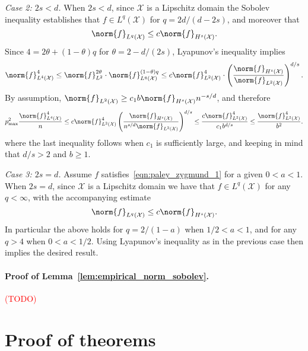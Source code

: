 \documentclass{article}
\newcommand{\1}{\mathbf{1}}
\newcommand{\Xset}{\mathcal{X}}
\newcommand{\Leb}{L}
\theoremstyle{alden}
\theoremstyle{aldenthm}
\theoremstyle{definition}
\theoremstyle{remark}
\begin{document}
\textit{Case 2: $2s < d$.}
When $2s < d$, since $\Xset$ is a Lipschitz domain the Sobolev inequality establishes that $f \in \Leb^q(\Xset)$ for $q = 2d/(d - 2s)$, and moreover that
\begin{equation*}
\norm{f}_{\Leb^q(\Xset)} \leq c \norm{f}_{H^s(\Xset)}.
\end{equation*}
Since $4 = 2\theta + (1 - \theta)q$ for $\theta = 2 - d/(2s)$, Lyapunov's inequality implies
\begin{equation*}
\norm{f}_{\Leb^4(\Xset)}^4 \leq \norm{f}_{\Leb^2}^{2\theta} \cdot \norm{f}_{\Leb^q(\Xset)}^{(1 - \theta)q} \leq c \norm{f}_{\Leb^2(\Xset)}^{4} \cdot \left(\frac{\norm{f}_{H^s(\Xset)}}{\norm{f}_{\Leb^2(\Xset)}}\right)^{d/s}.
\end{equation*}
By assumption, $\norm{f}_{\Leb^2(\Xset)} \geq c_1 b \norm{f}_{H^s(\Xset)} n^{-s/d}$, and therefore
\begin{equation*}
p_{\max}^2 \frac{\norm{f}_{\Leb^4(\Xset)}^4}{n} \leq c\norm{f}_{\Leb^2(\Xset)}^4 \left(\frac{\norm{f}_{H^s(\Xset)}}{n^{s/d}\norm{f}_{\Leb^2(\Xset)}}\right)^{d/s} \leq \frac{c\norm{f}_{\Leb^2(\Xset)}^4}{c_1b^{d/s}} \leq \frac{\norm{f}_{\Leb^2(\Xset)}^4}{b^2}.
\end{equation*}
where the last inequality follows when $c_1$ is sufficiently large, and keeping in mind that $d/s > 2$ and $b \geq 1$. 

\textit{Case 3: $2s = d$.}
Assume $f$ satisfies~\eqref{eqn:paley_zygmund_1} for a given $0 < a < 1$. When $2s = d$, since $\Xset$ is a Lipschitz domain we have that $f \in L^q(\Xset)$ for any $q < \infty$, with the accompanying estimate
\begin{equation*}
\norm{f}_{\Leb^q(\Xset)} \leq c \norm{f}_{H^s(\Xset)}.
\end{equation*}
In particular the above holds for $q = 2/(1 - a)$ when $1/2 < a < 1$, and for any $q > 4$ when $0 < a < 1/2$. Using Lyapunov's inequality as in the previous case then implies the desired result.

\paragraph{Proof of Lemma~\ref{lem:empirical_norm_sobolev}.}

\textcolor{red}{(TODO)}

\section{Proof of theorems}
\end{document}
